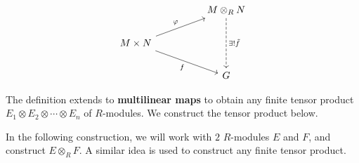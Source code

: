 \[\begin{tikzcd}
	&& {M \otimes _RN} \\
	{M \times N} \\
	&& G
	\arrow["{\exists ! \tilde f}", dashed, from=1-3, to=3-3]
	\arrow["\varphi", from=2-1, to=1-3]
	\arrow["f"', from=2-1, to=3-3]
\end{tikzcd}\]

The definition extends to \textbf{multilinear maps} to obtain any finite tensor product $E_1 \otimes E_2 \otimes \cdots \otimes E_n$ of $R$-modules. We construct the tensor product below.

In the following construction, we will work with $2$ $R$-modules $E$ and $F$, and construct $E \otimes _RF$. A similar idea is used to construct any finite tensor product.

